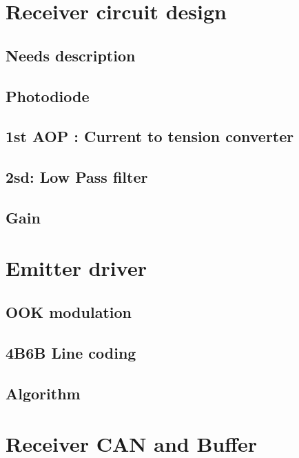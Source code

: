 \section{Receiver circuit design}

\subsection{Needs description}
\subsection{Photodiode}
\subsection{1st AOP : Current to tension converter}
\subsection{2sd: Low Pass filter}
\subsection{Gain}


\section{Emitter driver}

\subsection{OOK modulation}
\subsection{4B6B Line coding}
\subsection{Algorithm}



\section{Receiver CAN and Buffer}

